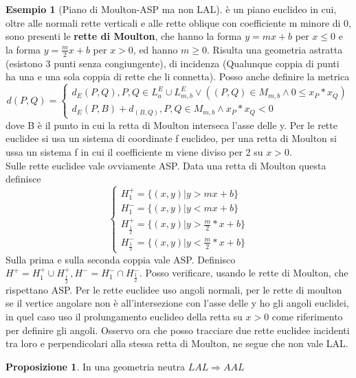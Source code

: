 \documentclass[a4paper,10pt]{article}
\theoremstyle{definition}
\theoremstyle{indentdefinition}
\theoremstyle{indentpostulate}
\theoremstyle{indenttheorem}
\newtheorem{prop}{Proposizione}[section]
\theoremstyle{myremark}
\newtheorem{example*}{Esempio}
\theoremstyle{indentgeneral}
\newenvironment{myboxed} 
{\noindent\begin{lrbox}{\mybox}\begin{minipage}{\textwidth}}
{\end{minipage}\end{lrbox}\fbox{\usebox{\mybox}}}
\begin{document}
\begin{example*}[Piano di Moulton-ASP ma non LAL] è un piano euclideo in cui, oltre alle normali rette verticali e alle rette oblique con coefficiente m minore di 0, sono presenti le \textbf{rette di Moulton}, che hanno la forma $y=mx+b$ per $x\leq 0$ e la forma $y= \frac{m}{2}x+b$ per $x>0$, ed hanno $m \geq 0$. Risulta una geometria astratta (esistono 3 punti senza congiungente), di incidenza (Qualunque coppia di punti ha una e una sola coppia di rette che li connetta). Posso anche definire la metrica $$d(P,Q)=\begin{cases}
    d_E(P,Q), P,Q\in L_a^E \cup L_{m,b}^E \lor ((P,Q) \in M_{m,b} \land 0 \leq x_P*x_Q)\\
    d_E(P,B)+d_(B,Q), P,Q \in M_{m,b} \land x_P*x_Q <0
\end{cases}$$
dove B è il punto in cui la retta di Moulton interseca l'asse delle y. Per le rette euclidee si usa un sistema di coordinate f euclideo, per una retta di Moulton si ussa un sistema f in cui il coefficiente m viene  diviso per 2 su $x>0$.\\
Sulle rette euclidee vale ovviamente ASP. Data una retta di Moulton questa definisce $$\begin{cases}
    H_1^+=\{ (x,y)|y>mx+b \} \\
     H_1^-= \{ (x,y)| y<mx+b \}\\
     H_{\frac{1}{2}}^+= \{ (x,y)|y> \frac{m}{2}*x+b \} \\
     H_{\frac{1}{2}}^-= \{ (x,y)| y< \frac{m}{2}*x+b \}
\end{cases}$$ Sulla prima e sulla seconda coppia vale ASP. Definisco $H^+=H_1^+ \cup H_{\frac{1}{2}}^+, H^-=H_1^- \cap H_{\frac{1}{2}}^-$. Posso verificare, usando le rette di Moulton, che rispettano ASP. Per le rette euclidee uso angoli normali, per le rette di moulton se il vertice angolare non è all'intersezione con l'asse delle y ho gli angoli euclidei, in quel caso uso il prolungamento euclideo della retta su $x>0$ come riferimento per definire gli angoli. Osservo ora che posso tracciare due rette euclidee incidenti tra loro e perpendicolari alla stessa retta di Moulton, ne segue che non vale LAL.
\end{example*} 




\begin{myboxed}
\begin{prop}  In una geometria neutra $LAL \Rightarrow AAL$    \end{prop} 
\end{myboxed}
\end{document}
